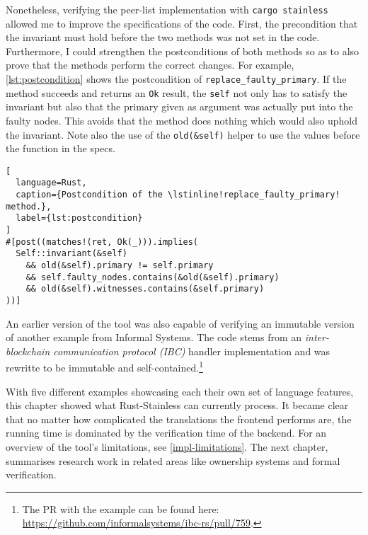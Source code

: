 Nonetheless, verifying the peer-list implementation with
\passthrough{\lstinline!cargo stainless!} allowed me  to improve the
specifications of the code. First, the precondition that the invariant must
hold before the two methods was not set in the code. Furthermore, I could
strengthen the postconditions of  both methods so as to also prove that the
methods perform the correct changes. For example, \autoref{lst:postcondition}
shows the postcondition of \lstinline!replace_faulty_primary!. If the method
succeeds and returns an \lstinline!Ok! result, the \lstinline!self! not only has
to satisfy the invariant but also that the primary given as argument  was
actually put into the faulty nodes. This avoids that the method does nothing
which would also uphold the invariant. Note also the use of the
\lstinline!old(&self)! helper to use the values before the function in the
specs.

\begin{lstlisting}[
  language=Rust,
  caption={Postcondition of the \lstinline!replace_faulty_primary! method.},
  label={lst:postcondition}
]
#[post((matches!(ret, Ok(_))).implies(
  Self::invariant(&self)
    && old(&self).primary != self.primary
    && self.faulty_nodes.contains(&old(&self).primary)
    && old(&self).witnesses.contains(&self.primary)
))]
\end{lstlisting}

An earlier version of the tool was also capable of verifying an immutable
version  of another example from Informal Systems. The code stems from an
\emph{inter-blockchain communication protocol (IBC)} handler implementation and
was rewritte to be immutable and self-contained.\footnote{The PR with the
example can be found here:
\url{https://github.com/informalsystems/ibc-rs/pull/759}.}

\hfill \break \noindent With five different examples showcasing each their own
set of language features, this chapter showed what Rust-Stainless can currently
process. It became clear that no matter how complicated the translations the
frontend performs are, the running time is dominated by the verification time of
the backend. For an overview of the tool's limitations, see
\autoref{impl-limitations}. The next chapter, summarises research  work in
related areas like ownership systems and formal verification.
